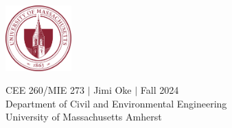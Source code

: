 \documentclass[12pt,twoside]{article}
\newcommand{\?}{\stackrel{?}{=}}
\begin{document}




\newpage
~
\thispagestyle{empty}
\vfill
\begin{center}
  \includegraphics[width=1in]{umass-seal}
  
  {\sc
    CEE 260/MIE 273 $|$ Jimi Oke $|$ Fall 2024\\
    Department of Civil and Environmental Engineering \\
    University of Massachusetts Amherst
  }
\end{center}
\end{document}
